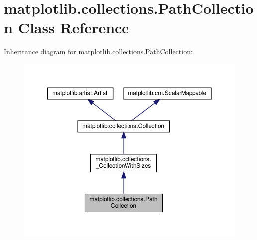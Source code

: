 \hypertarget{classmatplotlib_1_1collections_1_1PathCollection}{}\section{matplotlib.\+collections.\+Path\+Collection Class Reference}
\label{classmatplotlib_1_1collections_1_1PathCollection}


Inheritance diagram for matplotlib.\+collections.\+Path\+Collection\+:
\nopagebreak
\begin{figure}[H]
\begin{center}
\leavevmode
\includegraphics[width=350pt]{classmatplotlib_1_1collections_1_1PathCollection__inherit__graph}
\end{center}
\end{figure}


